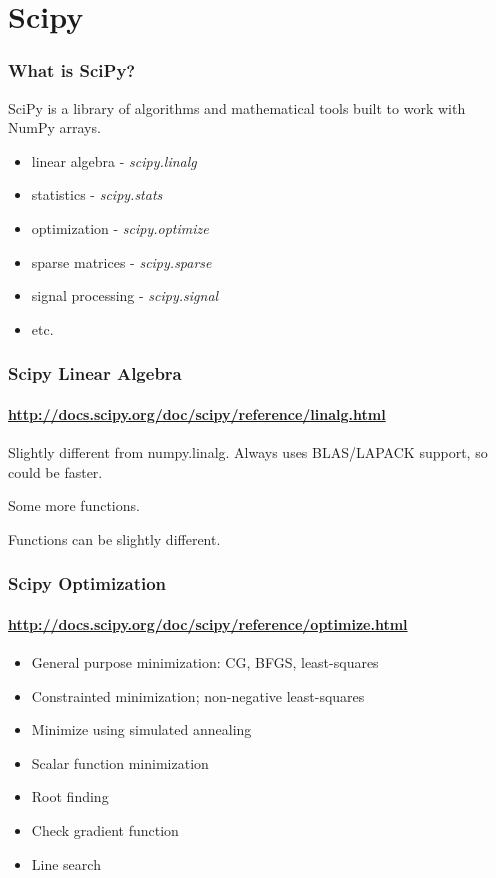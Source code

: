 \section{Scipy} %
\label{sec:scipy}

\begin{frame}
\frametitle{What is SciPy?}
SciPy is a library of algorithms and mathematical tools built to work with NumPy arrays.
\vfill
\begin{itemize}
\item linear algebra - \textit{scipy.linalg}
\item{statistics - \textit{scipy.stats}}
\item{optimization - \textit{scipy.optimize}}
\item{sparse matrices - \textit{scipy.sparse}}
\item{signal processing - \textit{scipy.signal}}
\item{etc.}
\end{itemize}
\end{frame}

\begin{frame}\frametitle{Scipy Linear Algebra}
    \framesubtitle{\url{http://docs.scipy.org/doc/scipy/reference/linalg.html}}

    Slightly different from numpy.linalg.
    Always uses BLAS/LAPACK support, so could be faster.

    \vfill

    Some more functions.

    \vfill

    Functions can be slightly different.

\end{frame}




\begin{frame}\frametitle{Scipy Optimization}
    \framesubtitle{\url{http://docs.scipy.org/doc/scipy/reference/optimize.html}}

\begin{itemize}
    \item General purpose minimization: CG, BFGS, least-squares
    \item Constrainted minimization; non-negative least-squares
    \item Minimize using simulated annealing
    \item Scalar function minimization
    \item Root finding
    \item Check gradient function
    \item Line search
\end{itemize}

\end{frame}

